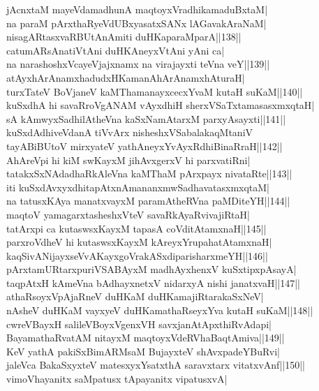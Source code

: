 \documentclass{article}
\begin{document}
jAcnxtaM mayeVdamadhunA maqtoyxVradhikamaduBxtaM|\\
na paraM pArxthaRyeVdUBxyasatxSANx lAGavakAraNaM|\\
nisagARtasxvaRBUtAnAmiti duHKaparaMparA||138||\\
catumARsAnatiVtAni duHKAneyxVtAni yAni ca|\\
na narashoshxVcayeVjajxnamx na virajayxti teVna veY||139||\\
atAyxhArAnamxhadudxHKamanAhArAnamxhAturaH|\\
turxTateV BoVjaneV kaMThamanayxcecxYvaM kutaH suKaM||140||\\
kuSxdhA hi savaRroVgANAM vAyxdhiH sherxVSaTxtamasasxmxqtaH|\\
sA kAmwyxSadhilAtheVna kaSxNamAtarxM parxyAsayxti||141||\\
kuSxdAdhiveVdanA tiVvArx nisheshxVSabalakaqMtaniV\\
tayABiBUtoV mirxyateV yathAneyxYvAyxRdhiBinaRraH||142||\\
AhAreVpi hi kiM swKayxM jihAvxgerxV hi parxvatiRni|\\
tatakxSxNAdadhaRkAleVna kaMThaM pArxpayx nivataRte||143||\\
iti kuSxdAvxyxdhitapAtxnAmananxmwSadhavatasxmxqtaM|\\
na tatusxKAya manatxvayxM paramAtheRVna paMDiteYH||144||\\
maqtoV yamagarxtasheshxVteV savaRkAyaRvivajiRtaH|\\
tatArxpi ca kutaswsxKayxM tapasA coVditAtamxnaH||145||\\
parxroVdheV hi kutaswsxKayxM kAreyxYrupahatAtamxnaH|\\
kaqSivANijayxseVvAKayxgoVrakASxdiparisharxmeYH||146||\\
pArxtamURtarxpuriVSABAyxM madhAyxhenxV kuSxtipxpAsayA|\\
taqpAtxH kAmeVna bAdhayxnetxV nidarxyA nishi janatxvaH||147||\\
athaRsoyxVpAjaRneV duHKaM duHKamajiRtarakaSxNeV|\\
nAsheV duHKaM vayxyeV duHKamathaRseyxYva kutaH suKaM||148||\\
cwreVBayxH salileVBoyxVgenxVH savxjanAtApxthiRvAdapi|\\
BayamathaRvatAM nitayxM maqtoyxVdeRVhaBaqtAmiva||149||\\
KeV yathA pakiSxBimARMsaM BujayxteV shAvxpadeYBuRvi|\\
jaleVca BakaSxyxteV matesxyxYsatxthA saravxtarx vitatxvAnf||150||\\
vimoVhayanitx saMpatusx tApayanitx vipatusxvA|\\
\end{document}
